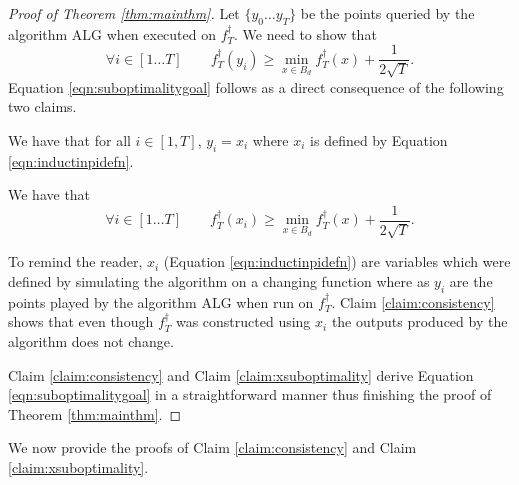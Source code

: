 \documentclass[final,12pt]{colt2018} %
\def\hardf{f^{\dagger}}
\def\alg{\mathrm{ALG}}
\begin{document}
\begin{proof}[Proof of Theorem \ref{thm:mainthm}]
Let $\{y_0 \ldots y_T\}$ be the points queried by the algorithm $\alg$ when executed on $\hardf_T$. We need to show that 
\begin{equation}
  \label{eqn:suboptimalitygoal}
  \forall i \in [1 \ldots T] \qquad \hardf_T(y_i) \geq \min_{x \in B_d} \hardf_T(x) + \frac{1}{2\sqrt{T}}.
\end{equation}
Equation \ref{eqn:suboptimalitygoal} follows as a direct consequence of the following two claims. 

\begin{claim}
\label{claim:consistency}
  We have that for all $i \in [1,T]$, $y_i = x_i$ where $x_i$ is defined by Equation \eqref{eqn:inductinpidefn}.
\end{claim}

\begin{claim}
\label{claim:xsuboptimality}
We have that
\[  \forall i \in [1 \ldots T] \qquad \hardf_T(x_i) \geq \min_{x \in B_d} \hardf_T(x) + \frac{1}{2\sqrt{T}}.\]
\end{claim} 

To remind the reader, $x_i$ (Equation \eqref{eqn:inductinpidefn}) are variables which were defined by simulating the algorithm on a changing function where as $y_i$ are the points played by the algorithm $\alg$ when run on $\hardf_T$. Claim \ref{claim:consistency} shows that even though $\hardf_T$ was constructed using $x_i$ the outputs produced by the algorithm does not change. 

Claim \ref{claim:consistency} and Claim \ref{claim:xsuboptimality} derive Equation \ref{eqn:suboptimalitygoal} in a straightforward manner thus finishing the proof of Theorem \ref{thm:mainthm}.

\end{proof}

We now provide the proofs of Claim \ref{claim:consistency} and Claim \ref{claim:xsuboptimality}. 
\end{document}
